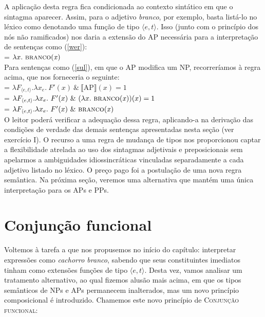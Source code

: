 \bigskip

\n A aplicação desta regra fica condicionada ao contexto sintático em que o sintagma aparecer. Assim, para o
adjetivo \textit{branco}, por exemplo, basta listá-lo no léxico
como denotando uma função de tipo $\langle e,t\rangle$. Isso
(junto com o princípio dos nós não ramificados) nos daria a
extensão do AP necessária para a interpretação de
sentenças como (\ref{wer}):\\

\n {} = $\lambda x.\ \predica{branco}{x}$\\

\n Para sentenças como (\ref{sul}), em que o AP modifica um NP,
recorreríamos à regra acima, que nos forneceria o seguinte:\\

\n {} = $\lambda F_{\langle e,t\rangle}.\lambda x_{e}.\
F'(x)\ \&\ \llbracket \text{AP} \rrbracket (x) = 1$\\

\n {} = $\lambda F_{\langle e,t\rangle}.\lambda x_{e}.\
F'(x)\ \&\ (\lambda x.\ \text{\textsc{branco}(\textit{x})})(x) = 1$\\

\n {} = $\lambda F_{\langle e,t\rangle}.\lambda x_{e}.\
F'(x)\ \&\ \text{\textsc{branco}(\textit{x})}$\\

\n O leitor poderá verificar a adequação dessa regra, aplicando-a
na derivação das condições de verdade das demais sentenças
apresentadas nesta seção (ver exercício I). O recurso a uma regra de mudança de tipos nos proporcionou captar a flexibilidade atrelada ao uso dos sintagmas adjetivais e preposicionais sem apelarmos a ambiguidades idiossincráticas vinculadas separadamente a cada adjetivo listado no léxico. O preço pago foi a postulação de uma nova regra semântica. Na próxima seção, veremos uma alternativa que mantém uma única interpretação para os APs e PPs. 

\section{Conjunção funcional}

Voltemos à tarefa a que nos propusemos no
início do capítulo: interpretar expressões como \textit{cachorro
branco}, sabendo que seus constituintes imediatos tinham como extensões funções de tipo $\langle e,t\rangle$. Desta vez, vamos
analisar um tratamento alternativo, ao qual fizemos alusão mais
acima, em que os tipos semânticos de NPs e APs permanecem
inalterados, mas um novo princípio composicional é introduzido.
Chamemos este novo princípio de \textsc{Conjunção funcional}:\\

